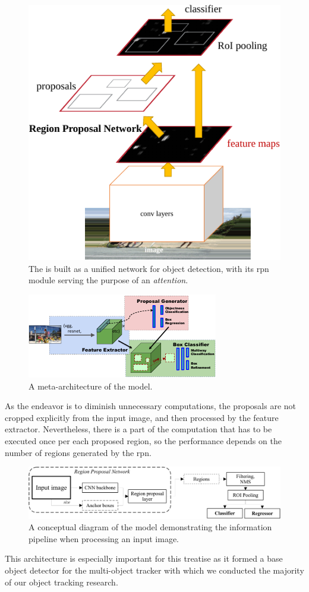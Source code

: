 \begin{figure}[t]
    \centerline{\includegraphics[width=0.5\linewidth]{figures/theoretical_foundations/faster_rcnn_rpn_module.pdf}}
    \caption[\fasterrcnn{} with the \gls{rpn}]{The \fasterrcnn{} is built as a unified network for object detection, with its \gls{rpn} module serving the purpose of an \emph{attention}. }
    \label{fig:FasterRCNNRPN}
\end{figure}

\begin{figure}[t]
    \centerline{\includegraphics[width=0.65\linewidth]{figures/theoretical_foundations/faster_rcnn_metaarchitecture.pdf}}
    \caption[\fasterrcnn{} meta-architecture]{A meta-architecture of the \fasterrcnn{} model. }
    \label{fig:FasterRCNNMetaArch}
\end{figure}

As the endeavor is to diminish unnecessary computations, the proposals are not cropped explicitly from the input image, and then processed by the feature extractor. Nevertheless, there is a part of the computation that has to be executed once per each proposed region, so the performance depends on the number of regions generated by the \gls{rpn}.

\begin{figure}[t]
    \centerline{\includegraphics[width=\linewidth]{figures/theoretical_foundations/fastercnn_diagram.pdf}}
    \caption[\fasterrcnn{} processing diagram]{A conceptual diagram of the \fasterrcnn{} model demonstrating the information pipeline when processing an input image.}
    \label{fig:FasterRCNNPipeline}
\end{figure}

This architecture is especially important for this treatise as it formed a base object detector for the multi-object tracker with which we conducted the majority of our object tracking research.
